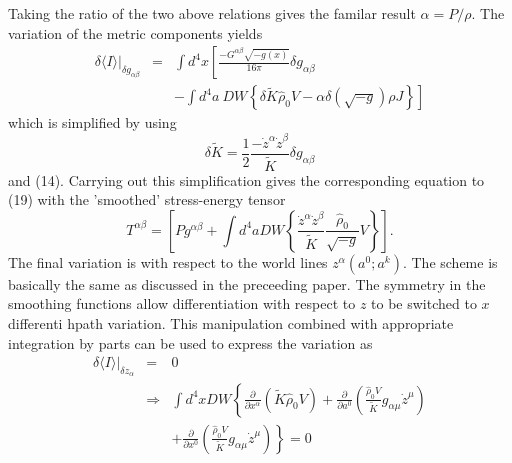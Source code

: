 Taking the ratio of the two above relations gives the familar result $\alpha = P/\rho$.
The variation of the metric components yields
\begin{eqnarray}
\delta \langle I \rangle \vert_{\delta g_{\alpha \beta}} &  = &  \int \! {d^4}x  
	\left[  \frac{-G^{\alpha \beta}\sqrt{-g(x)}}{16\pi} \delta g_{\alpha \beta}
	\right. \nonumber \\
		  & & \left.
	       - \int \! {d^4}a \ D W 
		\left\{
			\delta {\tilde K} {\hat \rho}_{0} V -
			\alpha \delta \left( \sqrt{-g} \right) \rho J
		\right\}
	\right]
\end{eqnarray}
which is simplified by using
\begin{equation}
\delta {\tilde K} = \frac{1}{2} \frac{- \dot z^{\alpha} \dot z^{\beta}}{{\tilde K}} \delta g_{\alpha \beta}
\end{equation}
and (14).  Carrying out this simplification gives the corresponding equation to (19) with the 'smoothed' stress-energy tensor
\begin{equation}
T^{\alpha \beta} = \left[
			P g^{\alpha \beta} +
			\int d^4a D W 
			\left\{
				\frac{\dot z^{\alpha} \dot z^{\beta}}{\tilde K}
				\frac{{\hat \rho}_{0}}{\sqrt{-g}} V
			\right\}
		   \right].
\end{equation}
The final variation is with respect to the world lines $z^{\alpha}(a^{0};a^{k})$.  The scheme is basically the same as discussed in the preceeding paper.  The symmetry in the smoothing functions allow differentiation with respect to $z$ to be switched to $x$ differenti hpath variation.  This manipulation combined with appropriate integration by parts can be used to express the variation as
\begin{eqnarray}
\delta \langle I \rangle \vert_{\delta z_{\alpha}} & = & 0 \nonumber \\
 & \Rightarrow & 
		\int \! {d^4}x D W 
		\left\{
			\frac{\partial}{\partial x^{\alpha}}
			\left(
				{\tilde K} {\hat \rho}_{0} V 
			\right)
			+
			\frac{\partial}{\partial a^{0}}
			\left(
				\frac{{\hat \rho}_{0} V}{{\tilde K}}
				g_{\alpha \mu} {\dot z^{\mu}}
			\right)
		\right.	\nonumber \\ 
& & 		
		\left.
			+
			\frac{\partial}{\partial x^{0}}
			\left(
				\frac{{\hat \rho}_{0} V}{{\tilde K}}
				g_{\alpha \mu} {\dot z^{\mu}}
			\right)
		\right\} = 0
\end{eqnarray}

